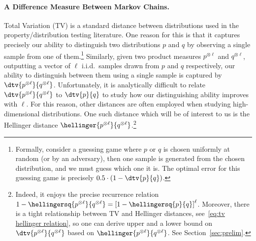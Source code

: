 \vspace{-5pt}\paragraph{A Difference Measure Between Markov Chains.}
%
%
%
Total Variation (TV) is a standard distance between distributions used in the property/distribution testing literature. One reason for this is that it captures precisely our ability to distinguish
two distributions $p$ and $q$ by observing a single sample from one of them.\footnote{Formally, consider a guessing game where $p$ or $q$ is chosen uniformly at random (or by an adversary), then one sample is generated from the chosen distribution, and we must guess which one it is. The optimal error for this guessing game is precisely $0.5\cdot(1-\dtv{p}{q})$.} 
Similarly, given two product measures $p^{\otimes \ell}$ and $q^{\otimes \ell}$, outputting a vector of $\ell$ i.i.d.~samples drawn from $p$ and $q$ respectively, our ability to distinguish between them using a single sample is captured by $\dtv{p^{\otimes \ell}}{q^{\otimes \ell}}$. Unfortunately, it is analytically difficult to relate $\dtv{p^{\otimes \ell}}{q^{\otimes \ell}}$ to $\dtv{p}{q}$ to study how our distinguishing ability improves with $\ell$. For this reason, other distances are often employed when studying high-dimensional distributions. One such distance which will be of interest to us is the Hellinger distance $\hellinger{p^{\otimes \ell}}{q^{\otimes \ell}}$.\footnote{Indeed, it enjoys the precise recurrence relation $1-\hellingersq{p^{\otimes \ell}}{q^{\otimes \ell}}=\left[1-\hellingersq{p}{q}\right]^{\ell}$. Moreover, there is a tight relationship between TV and Hellinger distances, see~\eqref{eq:tv hellinger relation}, so one can derive upper and a lower bound on $\dtv{p^{\otimes \ell}}{q^{\otimes \ell}}$ based on $\hellinger{p^{\otimes \ell}}{q^{\otimes \ell}}$. See Section~\ref{sec:prelim}.}
